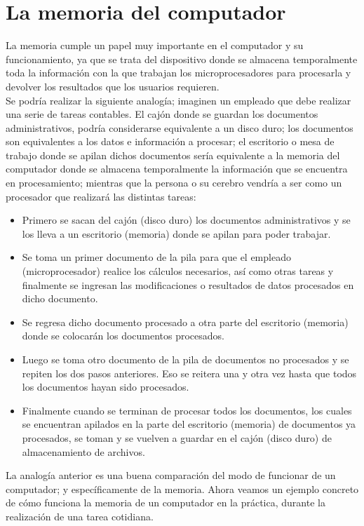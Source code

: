 \documentclass{article}
\begin{document}
\section*{La memoria del computador}
La memoria cumple un papel muy importante en el computador y su funcionamiento, ya que se
trata del dispositivo donde se almacena temporalmente toda la información con la que trabajan
los microprocesadores para procesarla y devolver los resultados que los usuarios requieren.\\[0.1cm]
Se podría realizar la siguiente analogía; imaginen un empleado que debe realizar una serie de
tareas contables. El cajón donde se guardan los documentos administrativos, podría
considerarse equivalente a un disco duro; los documentos son equivalentes a los datos e
información a procesar; el escritorio o mesa de trabajo donde se apilan dichos documentos
sería equivalente a la memoria del computador donde se almacena temporalmente la
información que se encuentra en procesamiento; mientras que la persona o su cerebro vendría
a ser como un procesador que realizará las distintas tareas:
\begin{itemize}
\item Primero se sacan del cajón (disco duro) los documentos administrativos y se los lleva a un
escritorio (memoria) donde se apilan para poder trabajar.
\item Se toma un primer documento de la pila para que el empleado (microprocesador) realice
los cálculos necesarios, así como otras tareas y finalmente se ingresan las modificaciones o
resultados de datos procesados en dicho documento.
\item Se regresa dicho documento procesado a otra parte del escritorio (memoria) donde se
colocarán los documentos procesados.
\item Luego se toma otro documento de la pila de documentos no procesados y se repiten los dos
pasos anteriores. Eso se reitera una y otra vez hasta que todos los documentos hayan sido
procesados.
\item Finalmente cuando se terminan de procesar todos los documentos, los cuales se encuentran
apilados en la parte del escritorio (memoria) de documentos ya procesados, se toman y se
vuelven a guardar en el cajón (disco duro) de almacenamiento de archivos.
\end{itemize}
La analogía anterior es una buena comparación del modo de funcionar de un computador; y
específicamente de la memoria. Ahora veamos un ejemplo concreto de cómo funciona la
memoria de un computador en la práctica, durante la realización de una tarea cotidiana.
\end{document}
